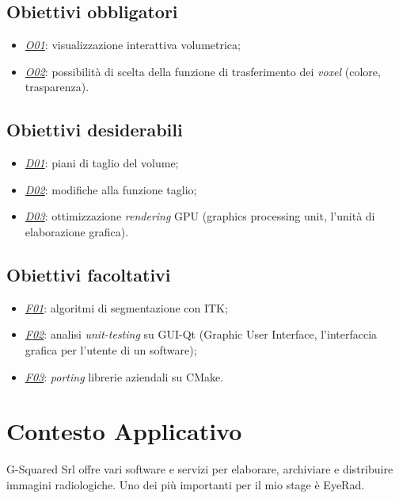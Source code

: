 \subsection{Obiettivi obbligatori}\label{sec:obiettivi-obbligatori}
\begin{itemize}
\item \underline{\textit{O01}}: visualizzazione interattiva volumetrica;
\item \underline{\textit{O02}}: possibilità di scelta della funzione di trasferimento dei \emph{voxel} (colore, trasparenza).
\end{itemize}

\subsection{Obiettivi desiderabili}\label{sec:obiettivi-desiderabili}
\begin{itemize}
\item \underline{\textit{D01}}: piani di taglio del volume;
\item \underline{\textit{D02}}: modifiche alla funzione taglio;
\item \underline{\textit{D03}}: ottimizzazione \emph{rendering} GPU (graphics processing unit, l'unità di elaborazione grafica).
\end{itemize}

\subsection{Obiettivi facoltativi}
\begin{itemize}
	 \item \underline{\textit{F01}}: algoritmi di segmentazione con ITK;
	 \item \underline{\textit{F02}}: analisi \emph{unit-testing} su GUI-Qt (Graphic User Interface, l'interfaccia grafica per l'utente di un software);
	 \item \underline{\textit{F03}}: \emph{porting} librerie aziendali su CMake.
\end{itemize}

\section{Contesto Applicativo}
G-Squared Srl offre vari software e servizi per elaborare, archiviare e distribuire immagini radiologiche. Uno dei più importanti per il mio stage è EyeRad.

